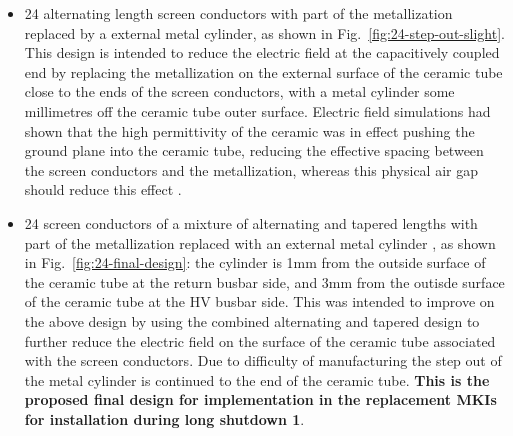 \begin{itemize}
\item{24 alternating length screen conductors with part of the metallization replaced by a external metal cylinder, as shown in Fig.~\ref{fig:24-step-out-slight}. This design is intended to reduce the electric field at the capacitively coupled end by replacing the metallization on the external surface of the ceramic tube close to the ends of the screen conductors, with a metal cylinder some millimetres off the ceramic tube outer surface. Electric field simulations had shown that the high permittivity of the ceramic was in effect pushing the ground plane into the ceramic tube, reducing the effective spacing between the screen conductors and the metallization, whereas this physical air gap should reduce this effect \cite{Barnes:mkiAlt}.}
\item{24 screen conductors of a mixture of alternating and tapered lengths with part of the metallization replaced with an external metal cylinder \cite{Barnes:mkiElecSurfCer}, as shown in Fig.~\ref{fig:24-final-design}: the cylinder is 1mm from the outside surface of the ceramic tube at the return busbar side, and 3mm from the outisde surface of the ceramic tube at the HV busbar side. This was intended to improve on the above design by using the combined alternating and tapered design to further reduce the electric field on the surface of the ceramic tube associated with the screen conductors. Due to difficulty of manufacturing the step out of the metal cylinder is continued to the end of the ceramic tube. \textbf{This is the proposed final design for implementation in the replacement MKIs for installation during long shutdown 1}.}
\end{itemize}

